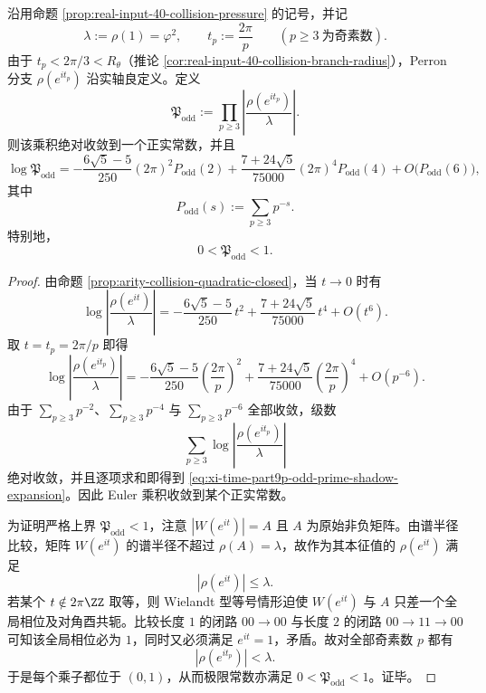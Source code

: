 \begin{theorem}\label{thm:xi-time-part9p-odd-prime-shadow-product}
沿用命题 \ref{prop:real-input-40-collision-pressure} 的记号，并记
\[
\lambda:=\rho(1)=\varphi^2,
\qquad
t_p:=\frac{2\pi}{p}\qquad (p\ge 3\ \text{为奇素数}).
\]
由于 \(t_p<2\pi/3<R_\theta\)（推论 \ref{cor:real-input-40-collision-branch-radius}），Perron 分支 \(\rho(e^{it_p})\) 沿实轴良定义。定义
\[
\mathfrak P_{\mathrm{odd}}
:=
\prod_{p\ge 3}
\left|
\frac{\rho(e^{it_p})}{\lambda}
\right|.
\]
则该乘积绝对收敛到一个正实常数，并且
\begin{equation}\label{eq:xi-time-part9p-odd-prime-shadow-expansion}
\log \mathfrak P_{\mathrm{odd}}
=
-\frac{6\sqrt5-5}{250}(2\pi)^2P_{\mathrm{odd}}(2)
+\frac{7+24\sqrt5}{75000}(2\pi)^4P_{\mathrm{odd}}(4)
+O\!\bigl(P_{\mathrm{odd}}(6)\bigr),
\end{equation}
其中
\[
P_{\mathrm{odd}}(s):=\sum_{p\ge 3}p^{-s}.
\]
特别地，
\[
0<\mathfrak P_{\mathrm{odd}}<1.
\]
\end{theorem}
\begin{proof}
由命题 \ref{prop:arity-collision-quadratic-closed}，当 \(t\to 0\) 时有
\[
\log\left|\frac{\rho(e^{it})}{\lambda}\right|
=
-\frac{6\sqrt5-5}{250}\,t^2
+\frac{7+24\sqrt5}{75000}\,t^4
+O(t^6).
\]
取 \(t=t_p=2\pi/p\) 即得
\[
\log\left|\frac{\rho(e^{it_p})}{\lambda}\right|
=
-\frac{6\sqrt5-5}{250}\left(\frac{2\pi}{p}\right)^2
+\frac{7+24\sqrt5}{75000}\left(\frac{2\pi}{p}\right)^4
+O(p^{-6}).
\]
由于 \(\sum_{p\ge 3}p^{-2}\)、\(\sum_{p\ge 3}p^{-4}\) 与 \(\sum_{p\ge 3}p^{-6}\) 全部收敛，级数
\[
\sum_{p\ge 3}\log\left|\frac{\rho(e^{it_p})}{\lambda}\right|
\]
绝对收敛，并且逐项求和即得到
\eqref{eq:xi-time-part9p-odd-prime-shadow-expansion}。因此 Euler 乘积收敛到某个正实常数。

为证明严格上界 \(\mathfrak P_{\mathrm{odd}}<1\)，注意 \(|W(e^{it})|=A\) 且 \(A\) 为原始非负矩阵。由谱半径比较，矩阵 \(W(e^{it})\) 的谱半径不超过 \(\rho(A)=\lambda\)，故作为其本征值的 \(\rho(e^{it})\) 满足
\[
\left|\rho(e^{it})\right|\le \lambda.
\]
若某个 \(t\notin 2\pi\ZZ\) 取等，则 Wielandt 型等号情形迫使 \(W(e^{it})\) 与 \(A\) 只差一个全局相位及对角酉共轭。比较长度 \(1\) 的闭路 \(00\to 00\) 与长度 \(2\) 的闭路 \(00\to 11\to 00\) 可知该全局相位必为 \(1\)，同时又必须满足 \(e^{it}=1\)，矛盾。故对全部奇素数 \(p\) 都有
\[
\left|\rho(e^{it_p})\right|<\lambda.
\]
于是每个乘子都位于 \((0,1)\)，从而极限常数亦满足 \(0<\mathfrak P_{\mathrm{odd}}<1\)。证毕。
\end{proof}

